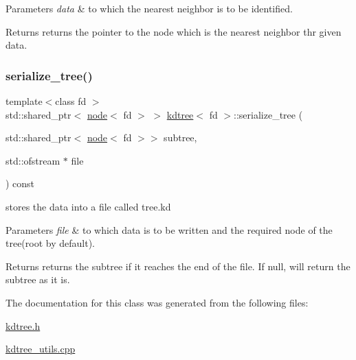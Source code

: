 \begin{DoxyParams}{Parameters}
{\em data} & to which the nearest neighbor is to be identified. \\
\hline
\end{DoxyParams}
\begin{DoxyReturn}{Returns}
returns the pointer to the node which is the nearest neighbor thr given data. 
\end{DoxyReturn}
\mbox{\label{classkdtree_a4e8a0ae6cd7464aa0f4ef0f9fb12d211}} 
\subsubsection{\texorpdfstring{serialize\+\_\+tree()}{serialize\_tree()}}
{\footnotesize\ttfamily template$<$class fd $>$ \\
std\+::shared\+\_\+ptr$<$ \hyperlink{classnode}{node}$<$ fd $>$ $>$ \hyperlink{classkdtree}{kdtree}$<$ fd $>$\+::serialize\+\_\+tree (\begin{DoxyParamCaption}\item[{std\+::shared\+\_\+ptr$<$ \hyperlink{classnode}{node}$<$ fd $>$$>$}]{subtree,  }\item[{std\+::ofstream $\ast$}]{file }\end{DoxyParamCaption}) const}



stores the data into a file called \textquotesingle{}tree.\+kd\textquotesingle{} 


\begin{DoxyParams}{Parameters}
{\em file} & to which data is to be written and the required node of the tree(root by default). \\
\hline
\end{DoxyParams}
\begin{DoxyReturn}{Returns}
returns the subtree if it reaches the end of the file. If null, will return the subtree as it is. 
\end{DoxyReturn}


The documentation for this class was generated from the following files\+:\begin{DoxyCompactItemize}
\item 
\hyperlink{kdtree_8h}{kdtree.\+h}\item 
\hyperlink{kdtree__utils_8cpp}{kdtree\+\_\+utils.\+cpp}\end{DoxyCompactItemize}
